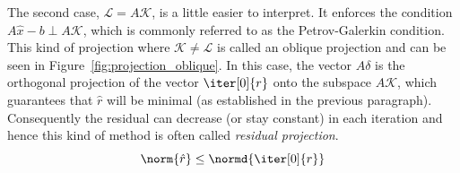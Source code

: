 The second case, $\mathcal{L}=A\mathcal{K}$, is a little easier to interpret. It enforces the condition $A\hat{x}-b \perp A\mathcal{K}$, which is commonly referred to as the Petrov-Galerkin condition. This kind of projection where $\mathcal{K} \neq \mathcal{L}$ is called an oblique projection and can be seen in Figure~\hyperref[fig:projection_oblique]{\ref{fig:projection_oblique}}. In this case, the vector $A\delta$ is the orthogonal projection of the vector $\iter[0]{r}$ onto the subspace $A\mathcal{K}$, which guarantees that $\hat{r}$ will be minimal (as established in the previous paragraph). Consequently the residual can decrease (or stay constant) in each iteration and hence this kind of method is often called \textit{residual projection}.
\begin{equation}
    \norm{\hat{r}}\leq \normd{\iter[0]{r}}
\end{equation}

